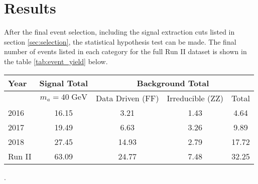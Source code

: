 
\section{Results}
\label{sec:res}
After the final event selection, including the signal extraction cuts listed in section \ref{sec:selection}, the statistical hypothesis test can be made. 
The final number of events listed in each category for the full Run II dataset is shown in the table \ref{tab:event_yield} below.


\begin{table}[h!tbp]
\centering
{}
\begin{tabular*}{0.9\textwidth}{l||c|c|c||c}
\hline
Year            &  Signal Total             & \multicolumn{3}{c}{Background Total} \\\hline
                & $m_a=40\;\text{GeV}$ & Data Driven (FF)  & Irreducible (ZZ)                 & Total\\\hline
2016                      & 16.15                       & 3.21             & 1.43                   & 4.64\\\hline
2017                      & 19.49                       & 6.63             & 3.26                   & 9.89\\\hline
2018                      & 27.45                       & 14.93             & 2.79                  & 17.72\\\hline\hline
Run II                      & 63.09                       & 24.77             & 7.48                & 32.25\\\hline
\end{tabular*}
\end{table}.
 



